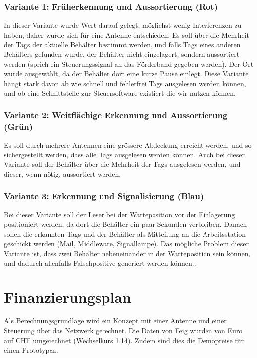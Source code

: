 \subsection{Variante 1: Früherkennung und Aussortierung (Rot)}
In dieser Variante wurde Wert darauf gelegt, möglichst wenig Interferenzen zu haben, daher wurde sich für eine Antenne entschieden. Es soll über die Mehrheit der Tags der aktuelle Behälter bestimmt werden, und falls Tags eines anderen Behälters gefunden wurde, der Behälter nicht eingelagert, sondern aussortiert werden (sprich ein Steuerungssignal an das Förderband gegeben werden). Der Ort wurde ausgewählt, da der Behälter dort eine kurze Pause einlegt. Diese Variante hängt stark davon ab wie schnell und fehlerfrei Tags ausgelesen werden können, und ob eine Schnittstelle zur Steuersoftware existiert die wir nutzen können.

\subsection{Variante 2: Weitflächige Erkennung und Aussortierung (Grün)}
Es soll durch mehrere Antennen eine grössere Abdeckung erreicht werden, und so sichergestellt werden, dass alle Tags ausgelesen werden können. Auch bei dieser Variante soll der Behälter über die Mehrheit der Tags ausgelesen werden, und dieser, wenn nötig, aussortiert werden.

\subsection{Variante 3: Erkennung und Signalisierung (Blau)}
Bei dieser Variante soll der Leser bei der Warteposition vor der Einlagerung positioniert werden, da dort die Behälter ein paar Sekunden verbleiben. Danach sollen die erkannten Tags und der Behälter als Mitteilung an die Arbeitsstation geschickt werden (Mail, Middleware, Signallampe). Das mögliche Problem dieser Variante ist, dass zwei Behälter nebeneinander in der Warteposition sein können, und dadurch allenfalls Falschpositive generiert werden können..

\chapter{Finanzierungsplan}

Als Berechnungsgrundlage wird ein Konzept mit einer Antenne und einer Steuerung über das Netzwerk gerechnet. Die Daten von Feig wurden von Euro auf CHF umgerechnet (Wechselkurs 1.14). Zudem sind dies die Demopreise für einen Prototypen.

